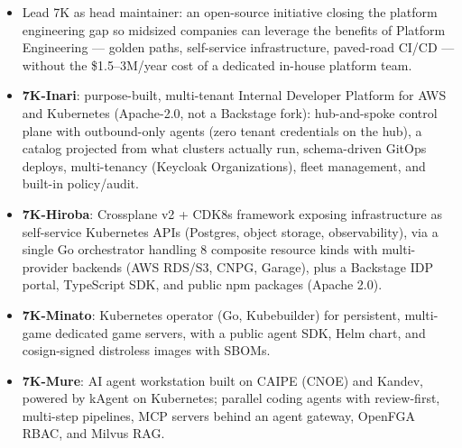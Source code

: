 \documentclass[10pt,a4paper]{altacv}
\begin{document}
\begin{itemize}
  \item Lead 7K as head maintainer: an open-source initiative closing the platform engineering gap so midsized companies can leverage the benefits of Platform Engineering --- golden paths, self-service infrastructure, paved-road CI/CD --- without the \$1.5--3M/year cost of a dedicated in-house platform team.
  \item \textbf{7K-Inari}: purpose-built, multi-tenant Internal Developer Platform for AWS and Kubernetes (Apache-2.0, not a Backstage fork): hub-and-spoke control plane with outbound-only agents (zero tenant credentials on the hub), a catalog projected from what clusters actually run, schema-driven GitOps deploys, multi-tenancy (Keycloak Organizations), fleet management, and built-in policy/audit.
  \item \textbf{7K-Hiroba}: Crossplane v2 + CDK8s framework exposing infrastructure as self-service Kubernetes APIs (Postgres, object storage, observability), via a single Go orchestrator handling 8 composite resource kinds with multi-provider backends (AWS RDS/S3, CNPG, Garage), plus a Backstage IDP portal, TypeScript SDK, and public npm packages (Apache 2.0).
  \item \textbf{7K-Minato}: Kubernetes operator (Go, Kubebuilder) for persistent, multi-game dedicated game servers, with a public agent SDK, Helm chart, and cosign-signed distroless images with SBOMs.
  \item \textbf{7K-Mure}: AI agent workstation built on CAIPE (CNOE) and Kandev, powered by kAgent on Kubernetes; parallel coding agents with review-first, multi-step pipelines, MCP servers behind an agent gateway, OpenFGA RBAC, and Milvus RAG.
\end{itemize}
\end{document}
